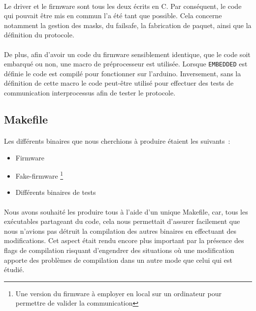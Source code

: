 \paragraph{}
Le driver et le firmware sont tous les deux écrits en C. Par conséquent, le
code qui pouvait être mis en commun l'a été tant que possible. Cela concerne
notamment la gestion des masks, du failsafe, la fabrication de paquet, ainsi
que la définition du protocole.

\paragraph{}
De plus, afin d'avoir un code du firmware sensiblement identique, que le code
soit embarqué ou non, une macro de préprocesseur est utilisée. Lorsque
\verb!EMBEDDED! est définie le code est compilé pour fonctionner sur
l'arduino. Inversement, sans la définition de cette macro le code peut-être
utilisé pour effectuer des tests de communication interprocessus afin de
tester le protocole.


\subsection{Makefile}
\paragraph{}
Les différents binaires que nous cherchions à produire étaient les suivants~:
\begin{itemize}
\item Firmware
\item Fake-firmware
      \footnote{Une version du firmware à employer en local sur un ordinateur
                pour permettre de valider la communication}
\item Différents binaires de tests
\end{itemize}

\paragraph{}
Nous avons souhaité les produire tous à l'aide d'un unique Makefile, car, tous
les exécutables partageant du code, cela nous permettait d'assurer facilement
que nous n'avions pas détruit la compilation des autres binaires en effectuant
des modifications. Cet aspect était rendu encore plus important par la présence
des flags de compilation risquant d'engendrer des situations où une modification
apporte des problèmes de compilation dans un autre mode que celui qui est
étudié.

